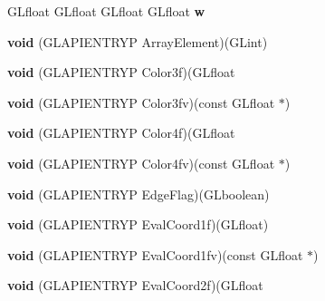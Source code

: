 \begin{DoxyCompactItemize}
G\+Lfloat G\+Lfloat G\+Lfloat G\+Lfloat {\bfseries w}
\item 
\mbox{\label{struct_g_lvertexformat_a515178289dd9adf6c1c005a36db7e65f}} 
{\bfseries void} (G\+L\+A\+P\+I\+E\+N\+T\+R\+YP Array\+Element)(G\+Lint)
\item 
\mbox{\label{struct_g_lvertexformat_afeccc4d7c18813ba1b42d28ff1d74d2b}} 
{\bfseries void} (G\+L\+A\+P\+I\+E\+N\+T\+R\+YP Color3f)(G\+Lfloat
\item 
\mbox{\label{struct_g_lvertexformat_af927a27f554d92053ab54fd080f65ab7}} 
{\bfseries void} (G\+L\+A\+P\+I\+E\+N\+T\+R\+YP Color3fv)(const G\+Lfloat $\ast$)
\item 
\mbox{\label{struct_g_lvertexformat_a8a8b4b107e0f0013a74ec96bbc221cdf}} 
{\bfseries void} (G\+L\+A\+P\+I\+E\+N\+T\+R\+YP Color4f)(G\+Lfloat
\item 
\mbox{\label{struct_g_lvertexformat_a0ca873eb3a0ad98f8b8098d01c8ad571}} 
{\bfseries void} (G\+L\+A\+P\+I\+E\+N\+T\+R\+YP Color4fv)(const G\+Lfloat $\ast$)
\item 
\mbox{\label{struct_g_lvertexformat_ab0914f091193d2e05b20173b9990a510}} 
{\bfseries void} (G\+L\+A\+P\+I\+E\+N\+T\+R\+YP Edge\+Flag)(G\+Lboolean)
\item 
\mbox{\label{struct_g_lvertexformat_a0a1402f5e0aa01bbeef18f668fd2c149}} 
{\bfseries void} (G\+L\+A\+P\+I\+E\+N\+T\+R\+YP Eval\+Coord1f)(G\+Lfloat)
\item 
\mbox{\label{struct_g_lvertexformat_ac7e8f058ab681032299618f1e0ab6fd1}} 
{\bfseries void} (G\+L\+A\+P\+I\+E\+N\+T\+R\+YP Eval\+Coord1fv)(const G\+Lfloat $\ast$)
\item 
\mbox{\label{struct_g_lvertexformat_ab157fe71463c85767bd7125e51130990}} 
{\bfseries void} (G\+L\+A\+P\+I\+E\+N\+T\+R\+YP Eval\+Coord2f)(G\+Lfloat
\item 
\mbox{\label{struct_g_lvertexformat_a1c766d00d1f84ed4ac2e151b968007f4}} 

\end{DoxyCompactItemize}

